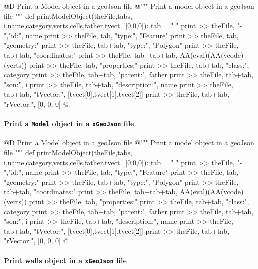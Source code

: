 \documentclass[11pt,oneside]{article}	%
\begin{document}
@D Print a Model object in a geoJson file
@{""" Print a model object in a geoJson file """
def printModelObject(theFile,tabs, i,name,category,verts,cells,father,tvect=[0,0,0]):
    tab = "    "
    print >> theFile, "-   ","id:", name
    print >> theFile, tab, "type:", "Feature"
    print >> theFile, tab, "geometry:" 
    print >> theFile, tab+tab, "type:", "Polygon"
    print >> theFile, tab+tab, "coordinates:" 
    print >> theFile, tab+tab+tab, AA(eval)(AA(vcode)(verts))
    print >> theFile, tab, "properties:"
    print >> theFile, tab+tab, "class:", category
    print >> theFile, tab+tab, "parent:", father
    print >> theFile, tab+tab, "son:", i
    print >> theFile, tab+tab, "description:", name
    print >> theFile, tab+tab, "tVector:", [tvect[0],tvect[1],tvect[2]]
    print >> theFile, tab+tab, "rVector:", [0, 0, 0]
@}

\paragraph{Print a \texttt{Model} object in a \texttt{xGeoJson} file}

@D Print a Model object in a geoJson file
@{""" Print a model object in a geoJson file """
def printModelObject(theFile,tabs, i,name,category,verts,cells,father,tvect=[0,0,0]):
    tab = "    "
    print >> theFile, "-   ","id:", name
    print >> theFile, tab, "type:", "Feature"
    print >> theFile, tab, "geometry:" 
    print >> theFile, tab+tab, "type:", "Polygon"
    print >> theFile, tab+tab, "coordinates:" 
    print >> theFile, tab+tab+tab, AA(eval)(AA(vcode)(verts))
    print >> theFile, tab, "properties:"
    print >> theFile, tab+tab, "class:", category
    print >> theFile, tab+tab, "parent:", father
    print >> theFile, tab+tab, "son:", i
    print >> theFile, tab+tab, "description:", name
    print >> theFile, tab+tab, "tVector:", [tvect[0],tvect[1],tvect[2]]
    print >> theFile, tab+tab, "rVector:", [0, 0, 0]
@}

\paragraph{Print walls object in a \texttt{xGeoJson} file}
\end{document}
